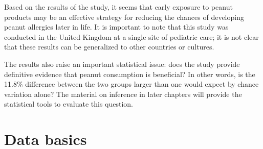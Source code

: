 Based on the results of the study, it seems that early exposure to peanut products may be an effective strategy for reducing the chances of developing peanut allergies later in life. It is important to note that this study was conducted in the United Kingdom at a single site of pediatric care; it is not clear that these results can be generalized to other countries or cultures.

The results also raise an important statistical issue: does the study provide definitive evidence that peanut consumption is beneficial? In other words, is the 11.8\% difference between the two groups larger than one would expect by chance variation alone? The material on inference in later chapters will provide the statistical tools to evaluate this question.

\section{Data basics}
\label{dataBasics}

